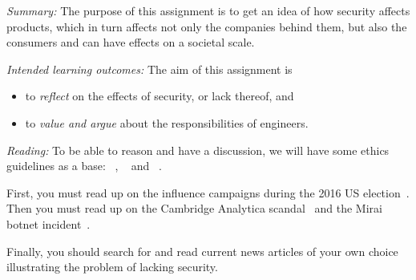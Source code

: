 

\emph{Summary:}
The purpose of this assignment is to get an idea of how security affects 
products, which in turn affects not only the companies behind them, but also 
the consumers and can have effects on a societal scale.

\emph{Intended learning outcomes:}
The aim of this assignment is
\begin{itemize}
\item to \emph{reflect} on the effects of security, or lack thereof, and
\item to \emph{value and argue} about the responsibilities of engineers.
\end{itemize}


\emph{Reading:}
%
To be able to reason and have a discussion, we will have some ethics guidelines 
as a base:
~\cite{acmcode},
~\cite{acmsecode} and
~\cite{ieeecode}.

First, you must read up on the influence campaigns during the 2016 US 
election~\cite{inside-russian-influence-campaign}.
Then you must read up on the Cambridge Analytica scandal~\cite[\eg][]{%
  wired-cambridge-analytica,
  guardian-cambridge-analytica,
  nytimes-cambridge-analytica,
  wp-cambridge-analytica,
} and the Mirai botnet incident~\cite{schneier-mirai}.

Finally, you should search for and read current news articles of your own 
choice illustrating the problem of lacking security.
